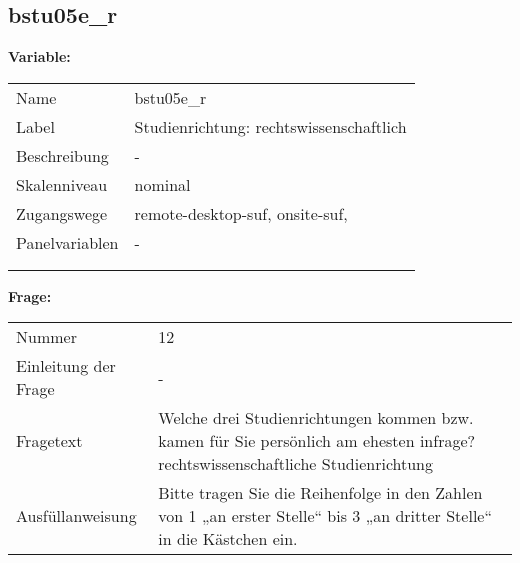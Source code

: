 	
	
	\subsection{bstu05e\_r}
	\label{subSection:bstu05e_r}

	\noindent\textbf{Variable:}\\
		\begin{tabular}{lL{11.3cm}}
			\label{tableVariable:bstu05e_r}
			Name & bstu05e\_r \\
			Label & Studienrichtung: rechtswissenschaftlich \\
			Beschreibung & - \\
			Skalenniveau & nominal \\
			Zugangswege &
				remote-desktop-suf,
				onsite-suf,
 \\
			Panelvariablen & -
			 \\
			 \\
 \\
		\end{tabular}

		\vspace*{1 cm}
		\noindent\textbf{Frage:}\\
		\begin{tabular}{lL{11.3cm}}
			\label{tableQuestion:bstu05e_r}
			Nummer & 12 \\
			Einleitung der Frage & - \\
			Fragetext & Welche drei Studienrichtungen kommen bzw. kamen für Sie persönlich am ehesten infrage?
rechtswissenschaftliche Studienrichtung \\
			Ausfüllanweisung & Bitte tragen Sie die Reihenfolge in den Zahlen von 1 „an erster Stelle“ bis 3 „an dritter Stelle“ in die Kästchen ein. \\
		\end{tabular}





